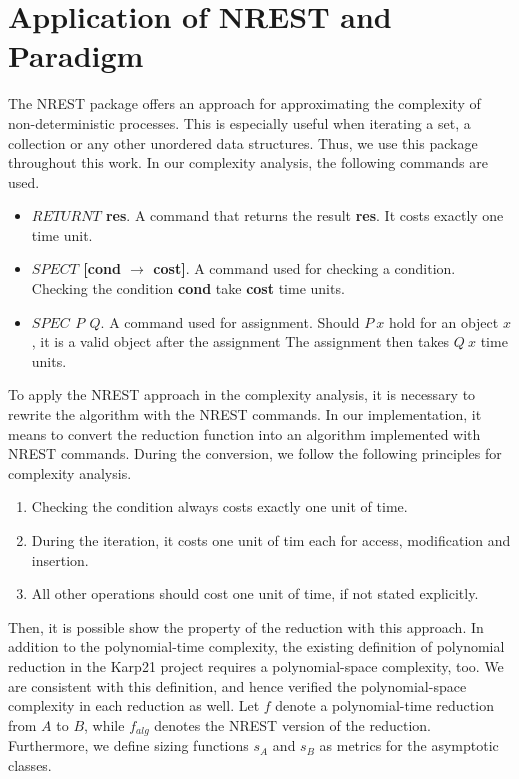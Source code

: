 \section{Application of NREST and Paradigm}
The NREST package offers an approach for approximating the complexity of non-deterministic processes.
This is especially useful when iterating a set, a collection or any other unordered data structures. Thus,
we use this package throughout this work. In our complexity analysis, the following commands are used. 
\begin{itemize}
    \item \textbf{$RETURNT$ res}. A command that returns the result \textbf{res}. It costs exactly one time unit.
    \item \textbf{$SPECT$ [cond $\rightarrow$ cost]}. A command used for checking a condition. Checking the condition \textbf{cond}
    take \textbf{cost} time units.
    \item \textbf{$SPEC$ $P$ $Q$}. A command used for assignment. Should $P\ x$ hold for an object $x$, it is a valid object after the assignment
    The assignment then takes $Q\ x$ time units.
\end{itemize}
To apply the NREST approach in the complexity analysis, it is necessary to rewrite the algorithm with the NREST commands.
In our implementation, it means to convert the reduction function into an algorithm implemented with NREST commands.
During the conversion, we follow the following principles for complexity analysis.
\begin{enumerate}
    \label{para1}
    \item Checking the condition always costs exactly one unit of time. 
    \item During the iteration, it costs one unit of tim each for access, modification and insertion.
    \item All other operations should cost one unit of time, if not stated explicitly.
\end{enumerate}
Then, it is possible show the property of the reduction with this approach. In addition to the polynomial-time complexity, 
the existing definition of polynomial reduction in the Karp21 project requires a polynomial-space complexity, too. 
We are consistent with this definition, and hence verified the polynomial-space complexity in each reduction as well.
Let $f$ denote a polynomial-time reduction from $A$ to $B$, while $f_{alg}$ denotes the NREST version of the reduction.
Furthermore, we define sizing functions $s_A$ and $s_B$ as metrics for the asymptotic classes.
